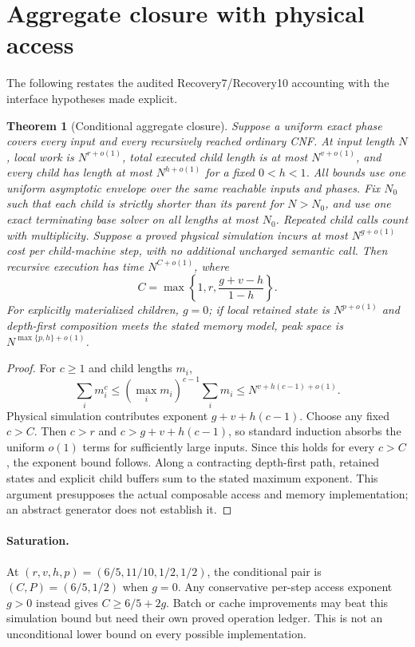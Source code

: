 \documentclass[11pt]{article}
\newtheorem{theorem}{Theorem}
\begin{document}
\section{Aggregate closure with physical access}
The following restates the audited Recovery7/Recovery10 accounting with the
interface hypotheses made explicit.
\begin{theorem}[Conditional aggregate closure]
Suppose a uniform exact phase covers every input and every recursively reached
ordinary CNF. At input length $N$, local work is $N^{r+o(1)}$, total executed
child length is at most $N^{v+o(1)}$, and every child has length at most
$N^{h+o(1)}$ for a fixed $0<h<1$. All bounds use one uniform asymptotic
envelope over the same reachable inputs and phases. Fix $N_0$ such that
each child is strictly shorter than its parent for $N>N_0$, and use one
exact terminating base solver on all lengths at most $N_0$.
Repeated child calls count with multiplicity.
Suppose a proved physical simulation incurs at most $N^{g+o(1)}$ cost per
child-machine step, with no additional uncharged semantic call. Then recursive
execution has time $N^{C+o(1)}$, where
\[
 C=\max\left\{1,r,\frac{g+v-h}{1-h}\right\}.
\]
For explicitly materialized children, $g=0$; if local retained state is
$N^{p+o(1)}$ and depth-first composition meets the stated memory model,
peak space is $N^{\max\{p,h\}+o(1)}$.
\end{theorem}
\begin{proof}
For $c\ge1$ and child lengths $m_i$,
\[
 \sum_i m_i^c\le(\max_i m_i)^{c-1}\sum_i m_i
 \le N^{v+h(c-1)+o(1)}.
\]
Physical simulation contributes exponent $g+v+h(c-1)$. Choose any fixed
$c>C$. Then $c>r$ and $c>g+v+h(c-1)$, so standard induction absorbs the
uniform $o(1)$ terms for sufficiently large inputs. Since this holds for
every $c>C$, the exponent bound follows. Along a contracting depth-first
path, retained states and explicit child buffers sum to the stated maximum
exponent. This argument presupposes the actual composable access and memory
implementation; an abstract generator does not establish it.
\end{proof}

\paragraph{Saturation.} At $(r,v,h,p)=(6/5,11/10,1/2,1/2)$, the conditional
pair is $(C,P)=(6/5,1/2)$ when $g=0$. Any conservative per-step access exponent
$g>0$ instead gives $C\ge6/5+2g$. Batch or cache improvements may beat this
simulation bound but need their own proved operation ledger. This is not an
unconditional lower bound on every possible implementation.
\end{document}
